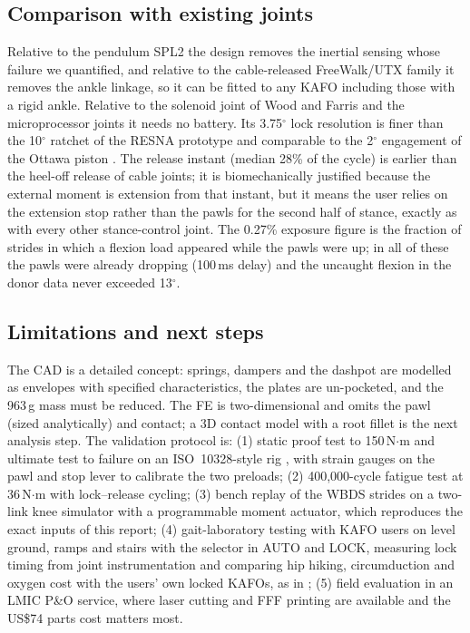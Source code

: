 \documentclass[11pt,a4paper]{article}
\begin{document}
\subsection{Comparison with existing joints}
Relative to the pendulum SPL2 the design removes the inertial sensing whose failure we quantified, and relative to the cable-released FreeWalk/UTX family it removes the ankle linkage, so it can be fitted to any KAFO including those with a rigid ankle. Relative to the solenoid joint of Wood and Farris \cite{embc2025solenoid} and the microprocessor joints it needs no battery. Its 3.75$^\circ$ lock resolution is finer than the 10$^\circ$ ratchet of the RESNA prototype \cite{resna2019_eveleight} and comparable to the 2$^\circ$ engagement of the Ottawa piston \cite{lemaire2009}. The release instant (median 28\% of the cycle) is earlier than the heel-off release of cable joints; it is biomechanically justified because the external moment is extension from that instant, but it means the user relies on the extension stop rather than the pawls for the second half of stance, exactly as with every other stance-control joint. The 0.27\% exposure figure is the fraction of strides in which a flexion load appeared while the pawls were up; in all of these the pawls were already dropping (100\,ms delay) and the uncaught flexion in the donor data never exceeded 13$^\circ$.

\subsection{Limitations and next steps}
The CAD is a detailed concept: springs, dampers and the dashpot are modelled as envelopes with specified characteristics, the plates are un-pocketed, and the 963\,g mass must be reduced. The FE is two-dimensional and omits the pawl (sized analytically) and contact; a 3D contact model with a root fillet is the next analysis step. The validation protocol is: (1) static proof test to 150\,N$\cdot$m and ultimate test to failure on an ISO~10328-style rig \cite{iso10328_amd2013}, with strain gauges on the pawl and stop lever to calibrate the two preloads; (2) 400{,}000-cycle fatigue test at 36\,N$\cdot$m with lock--release cycling; (3) bench replay of the WBDS strides on a two-link knee simulator with a programmable moment actuator, which reproduces the exact inputs of this report; (4) gait-laboratory testing with KAFO users on level ground, ramps and stairs with the selector in AUTO and LOCK, measuring lock timing from joint instrumentation and comparing hip hiking, circumduction and oxygen cost with the users' own locked KAFOs, as in \cite{zissimopoulos2007,davis2010}; (5) field evaluation in an LMIC P\&O service, where laser cutting and FFF printing are available and the US\$74 parts cost matters most.
\end{document}

